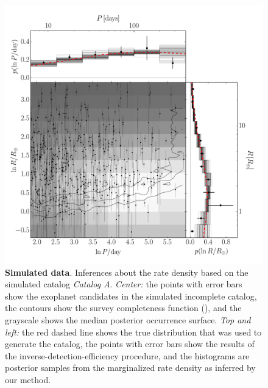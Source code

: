 \documentclass[12pt,preprint]{aastex}
\newcommand{\figlabel}[1]{\label{fig:#1}}
\newcommand{\modela}{\emph{Catalog A}}
\begin{document}
\clearpage

\begin{figure}[p]
\begin{center}
\includegraphics[width=\textwidth]{figures/smooth/results.pdf}
\end{center}
\caption{%
{\bf Simulated data}.
Inferences about the rate density based on the simulated catalog \modela.
\emph{Center:} the points with error bars show the exoplanet candidates in the
simulated incomplete catalog, the contours show the survey completeness
function (\citealt{petigura}), and the grayscale shows the median posterior
occurrence surface.
\emph{Top and left:} the red dashed line shows the true distribution that was
used to generate the catalog, the points with error bars show the results of
the inverse-detection-efficiency procedure, and the histograms are posterior
samples from the marginalized rate density as inferred by our method.
\figlabel{smooth-results}}
\end{figure}
\end{document}

